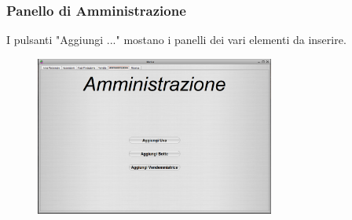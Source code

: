 \documentclass{article}
\begin{document}
\subsubsection{Panello di Amministrazione}
I pulsanti "Aggiungi ..." mostano i panelli dei vari elementi da inserire.\\
\begin{figure}[htbp]
\centering
\includegraphics[width=0.7\textwidth]{img/panel_amministrazione_init.png}
\end{figure}\\
\end{document}
